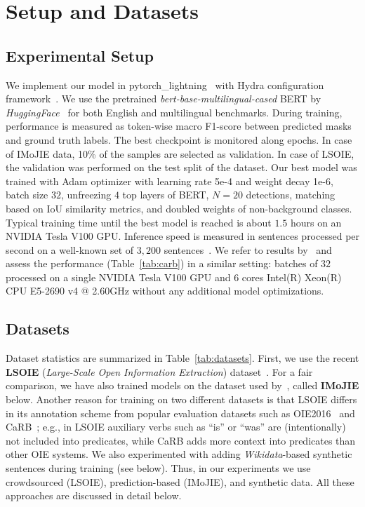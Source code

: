 \documentclass[letterpaper]{article} \usepackage{aaai22}  \usepackage{times}  \usepackage{helvet}  \usepackage{courier}  \usepackage[hyphens]{url}  \usepackage{graphicx} \usepackage{placeins}
\newcommand{\camera}[1]{\textcolor{black}{#1}}
\begin{document}
\section{Setup and Datasets}\label{sec:experimental_setup}
\subsection{Experimental Setup}

We implement our model in pytorch\_lightning~\cite{falcon2019pytorch} with Hydra configuration framework~\cite{Yadan2019Hydra}. We use the pretrained \emph{bert-base-multilingual-cased} BERT by \emph{HuggingFace}~\cite{wolf-etal-2020-transformers} for both English and multilingual benchmarks.
During training, performance is measured as token-wise macro F1-score between predicted masks and ground truth labels. The best checkpoint is monitored along epochs. In case of IMoJIE data, 10\% of the samples are selected as validation. In case of LSOIE, the validation was performed on the test split of the dataset.
Our best model was trained with Adam optimizer with learning rate 5e-4 and weight decay 1e-6, batch size $32$, unfreezing $4$ top layers of BERT, $N=20$ detections, matching based on IoU similarity metrics, 
and doubled weights of non-background classes.
 Typical training time until the best model is reached is about $1.5$ hours on an NVIDIA Tesla V100 GPU.
Inference speed is measured in sentences processed per second on a well-known set of $3{,}200$ sentences~\cite{stanovsky-etal-2018-supervised}. We refer to results by~\citet{kolluru2020openie6} and assess the performance (Table~\ref{tab:carb}) in a similar setting: batches of $32$ processed on a single NVIDIA Tesla V100 GPU and 6 cores Intel(R) Xeon(R) CPU E5-2690 v4 @ 2.60GHz without any additional model optimizations.

\subsection{Datasets}\label{ssec:data}

Dataset statistics are summarized in Table~\ref{tab:datasets}.
First, we use the recent \textbf{LSOIE} (\emph{Large-Scale Open Information Extraction}) dataset~\cite{lsoie-2021}.
For a fair comparison, we have also trained models on the dataset used by~\citet{kolluru2020openie6,kolluru2020imojie}, called \textbf{IMoJIE} below. 
Another reason for training on two different datasets is that LSOIE
differs in its annotation scheme from 
popular evaluation datasets such as OIE2016~\cite{Stanovsky2016EMNLP} and CaRB~\cite{bhardwaj-etal-2019-carb};
\camera{e.g.}, in LSOIE auxiliary verbs such as ``is'' or ``was'' are (intentionally) not included into predicates, while CaRB adds more context into predicates than other OIE systems.
We also experimented with adding \emph{Wikidata}-based synthetic sentences during training (see below).
Thus, in our experiments we use crowdsourced (LSOIE), prediction-based (IMoJIE), and synthetic data. All these approaches are discussed in detail below.
\end{document}
